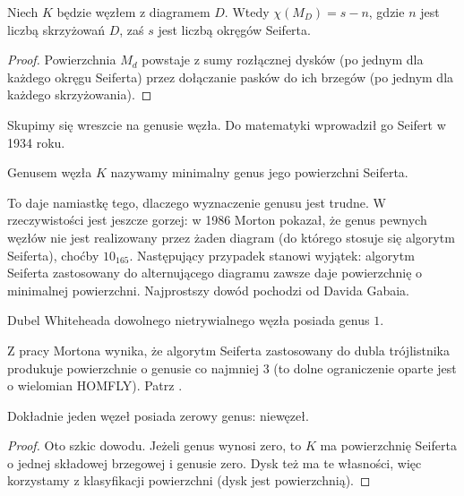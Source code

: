 
\begin{proposition}
    Niech $K$ będzie węzłem z diagramem $D$. Wtedy $\chi(M_D) = s - n$, gdzie $n$ jest liczbą skrzyżowań $D$, zaś $s$ jest liczbą okręgów Seiferta.
\end{proposition}

\begin{proof}
Powierzchnia $M_d$ powstaje z sumy rozłącznej dysków (po jednym dla każdego okręgu Seiferta) przez dołączanie pasków do ich brzegów (po jednym dla każdego skrzyżowania).
\end{proof}

Skupimy się wreszcie na genusie węzła.
Do matematyki wprowadził go Seifert w 1934 roku.

\begin{definition}
    Genusem węzła $K$ nazywamy minimalny genus jego powierzchni Seiferta.
\end{definition}

To daje namiastkę tego, dlaczego wyznaczenie genusu jest trudne.
W rzeczywistości jest jeszcze gorzej: w 1986 Morton pokazał, że genus pewnych węzłów nie jest realizowany przez żaden diagram (do którego stosuje się algorytm Seiferta), choćby $10_{165}$.
Następujący przypadek stanowi wyjątek: algorytm Seiferta zastosowany do alternującego diagramu zawsze daje powierzchnię o minimalnej powierzchni.
Najprostszy dowód pochodzi od Davida Gabaia.

\begin{example}
    Dubel Whiteheada dowolnego nietrywialnego węzła posiada genus $1$.
\end{example}

Z pracy Mortona wynika, że algorytm Seiferta zastosowany do dubla trójlistnika produkuje powierzchnie o genusie co najmniej $3$ (to dolne ograniczenie oparte jest o wielomian HOMFLY).
Patrz \cite{morton86}.

\begin{proposition}
\label{genus_one}
    Dokładnie jeden węzeł posiada zerowy genus: niewęzeł.
\end{proposition}

\begin{proof}
    Oto szkic dowodu.
    Jeżeli genus wynosi zero, to $K$ ma powierzchnię Seiferta o jednej składowej brzegowej i genusie zero.
Dysk też ma te własności, więc korzystamy z klasyfikacji powierzchni (dysk jest powierzchnią).
\end{proof}

